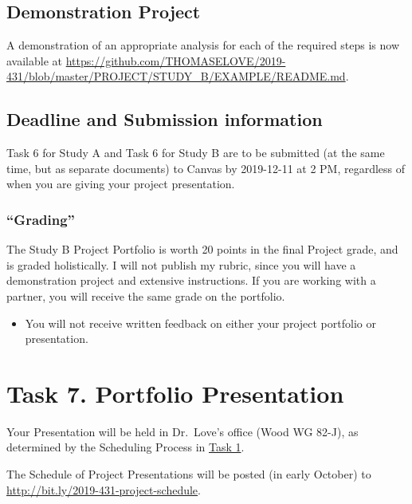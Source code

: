 \documentclass[]{book}
\providecommand{\tightlist}{%
  \setlength{\itemsep}{0pt}\setlength{\parskip}{0pt}}
\begin{document}
\hypertarget{demonstration-project-1}{%
\section{Demonstration Project}\label{demonstration-project-1}}

A demonstration of an appropriate analysis for each of the required steps is now available at \url{https://github.com/THOMASELOVE/2019-431/blob/master/PROJECT/STUDY_B/EXAMPLE/README.md}.

\hypertarget{deadline-and-submission-information-10}{%
\section{Deadline and Submission information}\label{deadline-and-submission-information-10}}

Task 6 for Study A and Task 6 for Study B are to be submitted (at the same time, but as separate documents) to Canvas by 2019-12-11 at 2 PM, regardless of when you are giving your project presentation.

\hypertarget{grading-10}{%
\subsection{``Grading''}\label{grading-10}}

The Study B Project Portfolio is worth 20 points in the final Project grade, and is graded holistically. I will not publish my rubric, since you will have a demonstration project and extensive instructions. If you are working with a partner, you will receive the same grade on the portfolio.

\begin{itemize}
\tightlist
\item
  You will not receive written feedback on either your project portfolio or presentation.
\end{itemize}

\hypertarget{task7}{%
\chapter{Task 7. Portfolio Presentation}\label{task7}}

Your Presentation will be held in Dr.~Love's office (Wood WG 82-J), as determined by the Scheduling Process in \protect\hyperlink{task1}{Task 1}.

The Schedule of Project Presentations will be posted (in early October) to \url{http://bit.ly/2019-431-project-schedule}.
\end{document}
